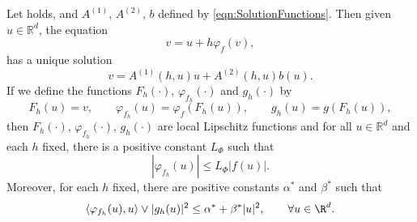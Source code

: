 \begin{lem}\label{lem:PhiFhProp}
	Let  holds, and $A^{(1)}$, $A^{(2)}$, $b$  
	defined by 
	\eqref{eqn:SolutionFunctions}. Then given $u\in\mathbb{R}^d$, the equation
	\begin{equation}\label{eqn:varphiEquation}
		v = u + h \varphi_f(v),
	\end{equation}
	has a unique solution 
	\begin{equation}\label{eqn:varphiEqnSolution}
		v = A^{(1)}(h,u)u +A^{(2)}(h,u) b(u)	.
	\end{equation}
%
	If we define the functions
	$F_h(\cdot)$, $\varphi_{f_h}(\cdot)$ and $g_h(\cdot)$ by
	\begin{equation}\label{eqn:FunctionshDefinition}
		F_h(u) = v,
			\qquad 
			\varphi_{f_h}(u) =\varphi_{f}(F_h(u)),
			\qquad
			g_h(u) = g(F_h(u)),
	\end{equation}
	then $F_h(\cdot)$, $\varphi_{f_h}(\cdot)$, $g_h(\cdot)$ are local Lipschitz functions 
	and for all $u\in \mathbb{R}^d$ and each $h$ fixed, there is a positive constant $L_{\Phi}$ such that
	\begin{equation}\label{eqn:PhifhFbound}
		|\varphi_{f_h}(u)|\leq L_{\Phi} |f(u)|. 
	\end{equation} 
	Moreover, for each $h$ fixed,
	 there are positive constants $\alpha^*$ and  $\beta^*$ such that
	\begin{equation}\label{eqn:h-MonotoneCondition}
		\innerprod{\varphi_{f_h}(u)}{u} \vee |g_h(u)|^2 \leq \alpha^* + \beta^* |u|^2, 
		\qquad
		\forall u \in \R^d.
	\end{equation}
\end{lem}
%
